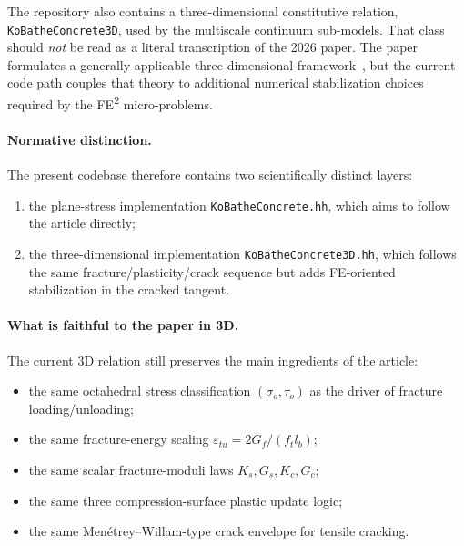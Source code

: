 The repository also contains a three-dimensional constitutive relation,
\texttt{KoBatheConcrete3D}, used by the multiscale continuum sub-models.
That class should \emph{not} be read as a literal transcription of the 2026
paper.  The paper formulates a generally applicable three-dimensional
framework~\cite{KoBathe2026}, but the current code path couples that theory to
additional numerical stabilization choices required by the FE\textsuperscript{2}
micro-problems.

\paragraph{Normative distinction.}
The present codebase therefore contains two scientifically distinct layers:
\begin{enumerate}
  \item the plane-stress implementation
    \texttt{KoBatheConcrete.hh}, which aims to follow the article directly;
  \item the three-dimensional implementation
    \texttt{KoBatheConcrete3D.hh}, which follows the same
    fracture/plasticity/crack sequence but adds FE-oriented stabilization in
    the cracked tangent.
\end{enumerate}

\paragraph{What is faithful to the paper in 3D.}
The current 3D relation still preserves the main ingredients of the article:
\begin{itemize}
  \item the same octahedral stress classification
    \((\sigma_o,\tau_o)\) as the driver of fracture loading/unloading;
  \item the same fracture-energy scaling
    \(\varepsilon_{tu} = 2G_f/(f_t l_b)\);
  \item the same scalar fracture-moduli laws
    \(K_s, G_s, K_c, G_c\);
  \item the same three compression-surface plastic update logic;
  \item the same Men\'etrey--Willam-type crack envelope for tensile cracking.
\end{itemize}

